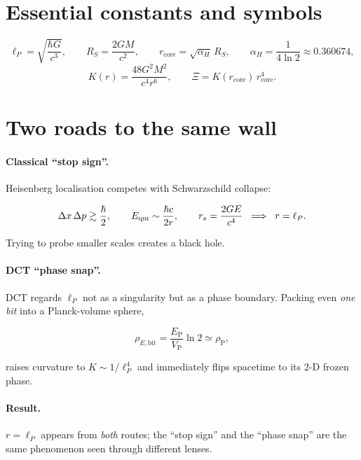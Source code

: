 \documentclass[a4paper, 12pt, oneside]{book}
\numberwithin{equation}{chapter}
\begin{document}
\section{Essential constants and symbols}
\[
\ell_P = \sqrt{\frac{\hbar G}{c^{3}}}, \qquad
R_S = \frac{2GM}{c^{2}}, \qquad
r_{\text{core}}=\sqrt{\alpha_H}\,R_S,\qquad
\alpha_H = \frac{1}{4\ln2}\approx 0.360674,
\]
\[
K(r)=\frac{48G^{2}M^{2}}{c^{4}r^{6}}, \qquad
\Xi = K(r_{\text{core}})\,r_{\text{core}}^{4}.
\]

\section{Two roads to the same wall}
\paragraph{Classical “stop sign”.}  
Heisenberg localisation competes with Schwarzschild collapse:

\[
\Delta x\,\Delta p \gtrsim \frac{\hbar}{2},\qquad
E_{\rm qm}\sim\frac{\hbar c}{2r},\qquad
r_s = \frac{2GE}{c^{4}}
\;\;\Longrightarrow\;\; r=\ell_P.
\]

Trying to probe smaller scales creates a black hole.

\paragraph{DCT “phase snap”.}  
DCT regards \(\ell_P\) not as a singularity but as a phase boundary.
Packing even \emph{one bit} into a Planck-volume sphere,

\[
\rho_{E,\text{bit}} = \frac{E_{\mathrm P}}{V_{\mathrm P}}\ln2
                     \simeq \rho_{\mathrm P},
\]

raises curvature to \(K\sim 1/\ell_P^{4}\) and immediately flips
spacetime to its 2-D frozen phase.

\paragraph{Result.}  \(\boxed{r=\ell_P}\) appears from \textit{both}
routes; the “stop sign” and the “phase snap” are the same phenomenon
seen through different lenses.

\end{document}
